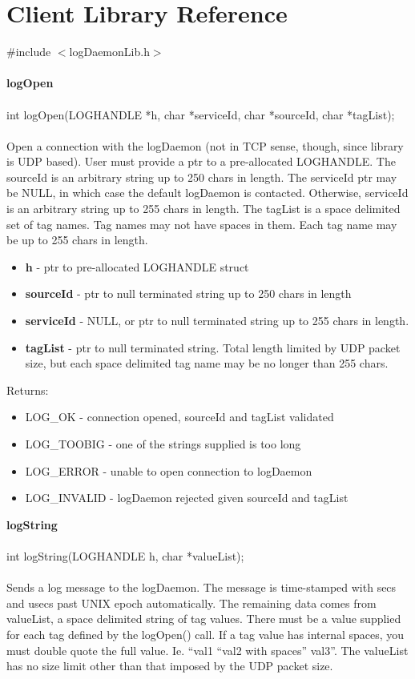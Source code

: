 \documentclass[11pt]{article}
\begin{document}
\section{Client Library Reference}

\#include $<$logDaemonLib.h$>$\\
\\
{\bf logOpen}\\
\\
int logOpen(LOGHANDLE *h, char *serviceId, char *sourceId, char *tagList);\\
\\
Open a connection with the logDaemon (not in TCP sense, though, since library is UDP based). User must provide a ptr to a pre-allocated LOGHANDLE. The sourceId is an arbitrary string up to 250 chars in length. The serviceId ptr may be NULL, in which case the default logDaemon is contacted. Otherwise, serviceId is an arbitrary string up to 255 chars in length. The tagList is a space delimited set of tag names. Tag names may not have spaces in them. Each tag name may be up to 255 chars in length.

\begin{itemize}
  \item {\bf h} - ptr to pre-allocated LOGHANDLE struct
  \item {\bf sourceId} - ptr to null terminated string up to 250 chars in length
  \item {\bf serviceId} - NULL, or ptr to null terminated string up to 255 chars in length.
  \item {\bf tagList} - ptr to null terminated string. Total length limited by UDP packet size, but each space delimited tag name may be no longer than 255 chars.
\end{itemize}
Returns:

\begin{itemize}
  \item LOG\_OK - connection opened, sourceId and tagList validated
  \item LOG\_TOOBIG - one of the strings supplied is too long
  \item LOG\_ERROR - unable to open connection to logDaemon
  \item LOG\_INVALID - logDaemon rejected given sourceId and tagList
\end{itemize}
{\bf logString}\\
\\
int logString(LOGHANDLE h, char *valueList);\\
\\
Sends a log message to the logDaemon. The message is time-stamped with secs and usecs past UNIX epoch automatically. The remaining data comes from valueList, a space delimited string of tag values. There must be a value supplied for each tag defined by the logOpen() call. If a tag value has internal spaces, you must double quote the full value. Ie. ``val1 ``val2 with spaces'' val3''. The valueList has no size limit other than that imposed by the UDP packet size.
\end{document}
